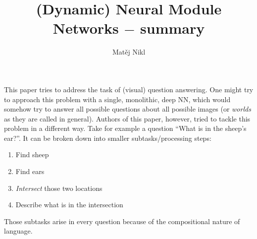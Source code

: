\documentclass[a4paper,twocolumn]{article}
\title{(Dynamic) Neural Module Networks $-$ summary}
\author{Matěj Nikl}
\begin{document}
\maketitle
\noindent
This paper tries to address the task of (visual) question answering. One might try to approach this problem with a single, monolithic, deep NN, which would somehow try to answer all possible questions about all possible images (or \textit{worlds} as they are called in general). Authors of this paper, however, tried to tackle this problem in a different way. Take for example a question ``What is in the sheep's ear?''. It can be broken down into smaller subtasks/processing steps:
    \begin{enumerate}
        \item Find sheep
        \item Find ears
        \item \textit{Intersect} those two locations
        \item Describe what is in the intersection
    \end{enumerate}
Those subtasks arise in every question because of the compositional nature of language.
\end{document}
